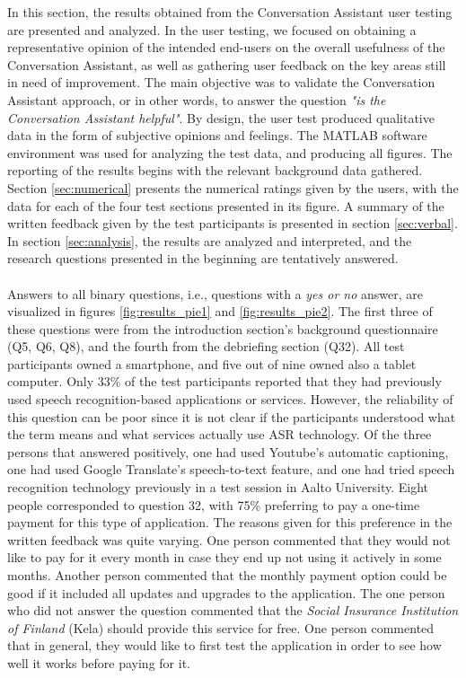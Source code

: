 \documentclass[english, 12pt, a4paper, pdftex, elec, utf8]{aaltothesis}
\begin{document}
In this section, the results obtained from the Conversation Assistant user testing are presented and analyzed. In the user testing, we focused on obtaining a representative opinion of the intended end-users on the overall usefulness of the Conversation Assistant, as well as gathering user feedback on the key areas still in need of improvement. The main objective was to validate the Conversation Assistant approach, or in other words, to answer the question \textit{"is the Conversation Assistant helpful"}. By design, the user test produced qualitative data in the form of subjective opinions and feelings. The MATLAB software environment was used for analyzing the test data, and producing all figures. The reporting of the results begins with the relevant background data gathered. Section \ref{sec:numerical} presents the numerical ratings given by the users, with the data for each of the four test sections presented in its figure. A summary of the written feedback given by the test participants is presented in section \ref{sec:verbal}. In section \ref{sec:analysis}, the results are analyzed and interpreted, and the research questions presented in the beginning are tentatively answered. \\\\
Answers to all binary questions, i.e., questions with a \textit{yes or no} answer, are visualized in figures \ref{fig:results_pie1} and \ref{fig:results_pie2}. The first three of these questions were from the introduction section's background questionnaire (Q5, Q6, Q8), and the fourth from the debriefing section (Q32). All test participants owned a smartphone, and five out of nine owned also a tablet computer. Only 33\% of the test participants reported that they had previously used speech recognition-based applications or services. However, the reliability of this question can be poor since it is not clear if the participants understood what the term means and what services actually use ASR technology. Of the three persons that answered positively, one had used Youtube's automatic captioning, one had used Google Translate's speech-to-text feature, and one had tried speech recognition technology previously in a test session in Aalto University. Eight people corresponded to question 32, with 75\% preferring to pay a one-time payment for this type of application. The reasons given for this preference in the written feedback was quite varying. One person commented that they would not like to pay for it every month in case they end up not using it actively in some months. Another person commented that the monthly payment option could be good if it included all updates and upgrades to the application. The one person who did not answer the question commented that the \textit{Social Insurance Institution of Finland} (Kela) should provide this service for free. One person commented that in general, they would like to first test the application in order to see how well it works before paying for it.
\end{document}
